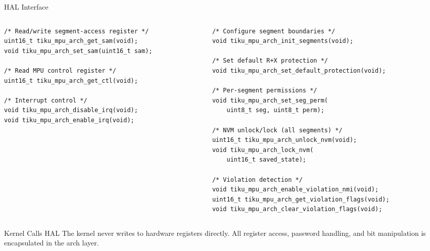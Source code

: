 \documentclass[aspectratio=169, 10pt]{beamer}
\begin{document}
\begin{frame}[fragile]{HAL Interface}
\begin{columns}[T]
\begin{column}{0.48\textwidth}
\begin{lstlisting}[style=cstyle, title={hal/tiku\_mpu\_hal.h --- Low-level}]
/* Read/write segment-access register */
uint16_t tiku_mpu_arch_get_sam(void);
void tiku_mpu_arch_set_sam(uint16_t sam);

/* Read MPU control register */
uint16_t tiku_mpu_arch_get_ctl(void);

/* Interrupt control */
void tiku_mpu_arch_disable_irq(void);
void tiku_mpu_arch_enable_irq(void);
\end{lstlisting}
\end{column}

\begin{column}{0.48\textwidth}
\begin{lstlisting}[style=cstyle, title={hal/tiku\_mpu\_hal.h --- Higher-level}]
/* Configure segment boundaries */
void tiku_mpu_arch_init_segments(void);

/* Set default R+X protection */
void tiku_mpu_arch_set_default_protection(void);

/* Per-segment permissions */
void tiku_mpu_arch_set_seg_perm(
    uint8_t seg, uint8_t perm);

/* NVM unlock/lock (all segments) */
uint16_t tiku_mpu_arch_unlock_nvm(void);
void tiku_mpu_arch_lock_nvm(
    uint16_t saved_state);

/* Violation detection */
void tiku_mpu_arch_enable_violation_nmi(void);
uint16_t tiku_mpu_arch_get_violation_flags(void);
void tiku_mpu_arch_clear_violation_flags(void);
\end{lstlisting}
\end{column}
\end{columns}

\vspace{0.3em}
\begin{block}{Kernel Calls HAL}
The kernel never writes to hardware registers directly.
All register access, password handling, and bit manipulation
is encapsulated in the arch layer.
\end{block}
\end{frame}
\end{document}
